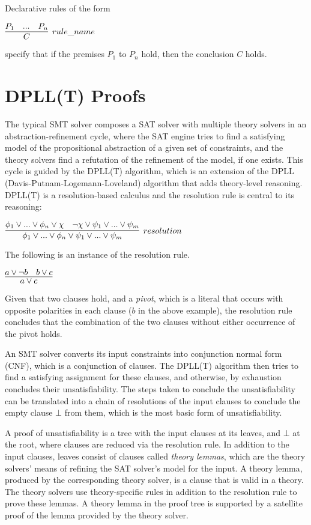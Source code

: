 \documentclass{article}
\begin{document}
	Declarative rules of the form
	\begin{center}
		$\infer[rule\_name]{C}{P_1 & ... & P_n}$
	\end{center}
	specify that if the premises $P_1$ to 
	$P_n$ hold, then the conclusion $C$
	holds.
	
	

\section{DPLL(T) Proofs}
\label{sec:smtproofs}
	The typical SMT solver composes 
	a SAT solver with multiple theory
	solvers in an abstraction-refinement
	cycle, where the SAT engine 
	tries to find a satisfying 
	model of the propositional
	abstraction of a given set of 
	constraints, and the theory
	solvers find a refutation of 
	the refinement of the model, if 
	one exists.
	This cycle is guided by the 
	DPLL(T) algorithm, which is an
	extension of the 
	DPLL~\cite{Loveland2016}
	(Davis-Putnam-Logemann-Loveland) 
	algorithm that adds theory-level 
	reasoning. DPLL(T) is a 
	resolution-based calculus and the 
	resolution rule is central to its 
	reasoning:
	\begin{center}
		$\infer[resolution]{\phi_1 \lor ... \lor 
			\phi_n \lor \psi_1 \lor ... \lor 
			\psi_m}{\phi_1 \lor ... \lor \phi_n 
			\lor \chi & \neg \chi \lor \psi_1 
			\lor ... \lor \psi_m}$ 
	\end{center}
	The following is an instance of the 
	resolution rule.
	\begin{center}
		$\infer{a \lor c}{a \lor \neg b 
			& b \lor c}$
	\end{center}
	Given that two clauses hold, 
	and a \textit{pivot}, which is a 
	literal that occurs with opposite 
	polarities in each clause ($b$ in 
	the above example), the resolution 
	rule concludes that 
	the combination of the two clauses 
	without either occurrence of the 
	pivot holds.
	
	An SMT solver converts its input 
	constraints into conjunction 
	normal form (CNF), which is a 
	conjunction of clauses. The 
	DPLL(T) algorithm then tries 
	to find a satisfying assignment 
	for these clauses, and 
	otherwise, by exhaustion 
	concludes their unsatisfiability.
	The steps taken to conclude 
	the unsatisfiability can be 
	translated into a chain of 
	resolutions of the input clauses 
	to conclude the empty clause 
	$\bot$ from them, which is the 
	most basic form of unsatisfiability.
	
	A proof of unsatisfiability is 
	a tree with the input clauses at 
	its leaves, and $\bot$ at the 
	root, where clauses are reduced
	via the resolution rule. In 
	addition to the input clauses, 
	leaves consist of clauses 
	called \textit{theory lemmas}, 
	which are the theory solvers' 
	means of refining the SAT solver's
	model for the input. A
	theory lemma, produced by the 
	corresponding theory
	solver, is a clause that is
	valid in a theory. The theory 
	solvers use theory-specific 
	rules in addition to the 
	resolution rule to prove these 
	lemmas. A theory lemma in the 
	proof tree is supported by a 
	satellite proof of the lemma
	provided by the theory solver. 
	
\end{document}

